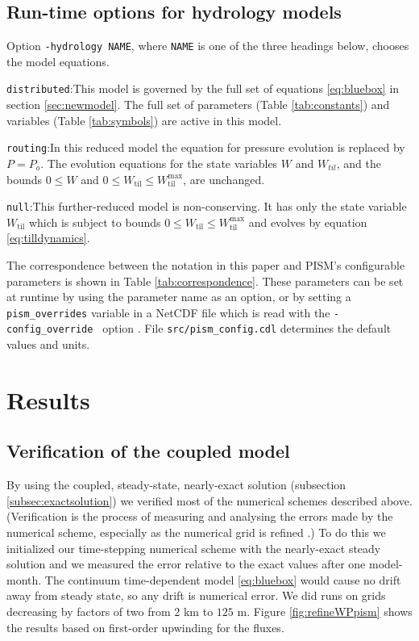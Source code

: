 \documentclass[gmd]{copernicus}   %
\newcommand{\text}{\textrm}
\newcommand{\Wtil}{W_{\text{til}}}
\newcommand{\Wtilmax}{W_{\text{til}}^{\text{max}}}
\begin{document}
\subsection{Run-time options for hydrology models} \label{subsec:pismdoc}  Option \texttt{-hydrology NAME}, where \texttt{NAME} is one of the three headings below, chooses the model equations.

\medskip
\noindent \texttt{distributed}:\quad  This model is governed by the full set of equations \eqref{eq:bluebox} in section \ref{sec:newmodel}.  The full set of parameters (Table \ref{tab:constants}) and variables (Table \ref{tab:symbols}) are active in this model.

\medskip
\noindent \texttt{routing}:\quad  In this reduced model the equation for pressure evolution is replaced by $P = P_o$.  The evolution equations for the state variables $W$ and $W_{til}$, and the bounds $0\le W$ and $0\le \Wtil \le \Wtilmax$, are unchanged.

\medskip
\noindent \texttt{null}:\quad  This further-reduced model is non-conserving.  It has only the state variable $\Wtil$ which is subject to bounds $0\le \Wtil \le \Wtilmax$ and evolves by equation \eqref{eq:tilldynamics}.

\medskip
The correspondence between the notation in this paper and PISM's configurable parameters is shown in Table \ref{tab:correspondence}.  These parameters can be set at runtime by using the parameter name as an option, or by setting a \verb|pism_overrides| variable in a NetCDF file which is read with the \verb|-config_override | option \citep{pism-user-manual}.  File \verb|src/pism_config.cdl| determines the default values and units.


\section{Results}  \label{sec:results}

\subsection{Verification of the coupled model}  By using the coupled, steady-state, nearly-exact solution (subsection \ref{subsec:exactsolution}) we verified most of the numerical schemes described above.  (Verification is the process of measuring and analysing the errors made by the numerical scheme, especially as the numerical grid is refined \citep{Wesseling}.)  To do this we initialized our time-stepping numerical scheme with the nearly-exact steady solution and we measured the error relative to the exact values after one model-month.  The continuum time-dependent model \eqref{eq:bluebox} would cause no drift away from steady state, so any drift is numerical error.  We did runs on grids decreasing by factors of two from $2$ km to $125$ m.  Figure \ref{fig:refineWPpism} shows the results based on first-order upwinding for the fluxes.
\end{document}
